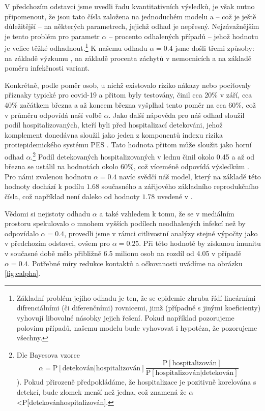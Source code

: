 V předchozím odstavci jsme uvedli řadu kvantitativních výsledků, je
však nutno připomenout, že jsou tato čísla založena na jednoduchém
modelu a -- což je ještě důležitější -- na některých parametrech,
jejichž odhad je nepřesný. Nejzávažnějším je tento problém pro parametr
$\alpha$ -- procento odhalených případů -- jehož hodnotu je velice
těžké odhadnout.\footnote{Základní problém jejího odhadu je ten, že se epidemie zhruba řídí
lineárními difrenciálními (či diferenčními) rovnicemi, jimž (případně
s jinými koeficienty) vyhovují libovolné násobky jejich řešení. Pokud
například pozorujeme polovinu případů, našemu modelu bude vyhovovat
i hypotéza, že pozorujeme všechny.} K našemu odhadu $\alpha=0.4$ jsme došli třemi způsoby: na základě výzkumu
\cite{paqcovid}, na základě procenta záchytů v nemocnicích a na základě poměru infekčnosti
variant. 

Konkrétně, podle \cite{paqcovid} poměr osob, u nichž existovalo riziko
nákazy nebo pociťovaly příznaky typické pro covid-19 a přitom byly testovány,
činil cca 20\% v září, cca 40\% začátkem března a až koncem března
vyšplhal tento poměr na cca 60\%, což v průměru odpovídá naší volbě $\alpha.$
Jako další nápověda pro náš odhad sloužil podíl hospitalizovaných,
kteří byli před hospitalizací detekováni, jehož komplement donedávna sloužil jako
jeden z komponentů indexu rizika protiepidemického systému PES \cite{PES}. Tato hodnota přitom může sloužit jako horní odhad $\alpha$.\footnote{Dle Bayesova vzorce 
\[
\alpha=\mathrm{P}[\text{detekován}|\text{hospitalizován}]\frac{\mathrm{P}[\text{hospitalizován}]}{\mathrm{P}[\text{hospitalizován}|\text{detekován}]}
\]
\cite{Pribylova2021Model}). Pokud přirozeně předpokládáme, že hospitalizace
je pozitivně korelována s detekcí, bude zlomek menší než jedna,
což znamená že $\alpha$\textless P{[}detekován\textbar hospitalizován{]}. } 
Podíl detekovaných hospitalizovaných v lednu činil okolo 0.45 a až od března se ustálil
na hodnotách okolo 60\%, což víceméně odpovídá výsledkům \cite{paqcovid}. 
Pro námi zvolenou hodnotu $\alpha=0.4$ navíc svědčí náš model, který na základě této hodnoty dochází k podílu $1.68$ současného a zářijového základního reprodukčního čísla, což například není daleko od hodnoty $1.78$ uvedené v \cite{curran2021transmission}. 

Vědomi si nejistoty odhadu $\alpha$ a také vzhledem k tomu, že se v mediálním prostoru spekulovalo o mnohem vyšších podílech neodhalených infekcí než by odpovídalo $\alpha=0.4$, provedli
jsme v rámci citlivostní analýzy stejné výpočty jako v předchozím
odstavci, ovšem pro $\alpha=0.25$. Při této hodnotě by získanou
imunitu v současné době mělo přibližně 6.5 milionu osob na rozdíl od 4.05 v
případě $\alpha=0.4$. Potřebné míry redukce kontaktů a očkovanosti uvádíme na obrázku \ref{fig:calpha}.

